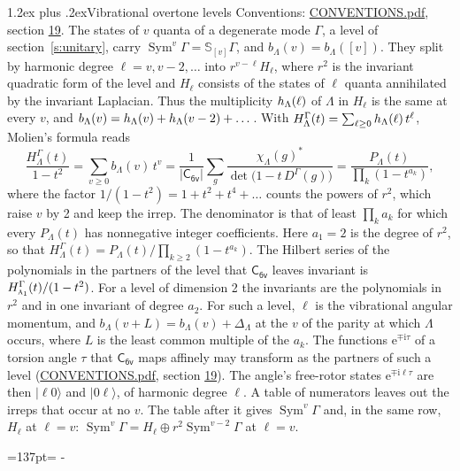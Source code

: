 \documentclass[10pt,a4paper]{article}
\makeatletter
\renewcommand\section{\@startsection{section}{1}{\z@}{-3ex plus -1ex minus -.2ex}%
  {1.2ex plus .2ex}{\normalfont\large\sffamily\bfseries\color{parttitle}}}
\newcommand{\needspace}[1]{\par\penalty-100\begingroup\dimen0=#1\relax\dimen2=\pagegoal
  \advance\dimen2-\pagetotal\ifdim\dimen0>\dimen2\relax\ifdim\dimen2>0pt\vfil\break\fi\fi
  \endgroup}
\numberwithin{equation}{section}
\newcommand{\grp}[1]{\mathsf{#1}}
\newcommand{\irr}[1]{\text{\normalfont\scshape #1}}
\newcommand{\iunit}{\mathrm{i}}
\newcommand{\expe}{\mathrm{e}}
\newcommand{\repD}[1]{D^{#1}}
\newcommand{\irchar}[1]{\chi_{#1}}
\newcommand{\conj}[1]{{#1}^{*}}
\newcommand{\schur}[1]{\mathbb{S}_{#1}}
\newcommand{\shape}[1]{[#1]}
\newcommand{\occ}[1]{\lvert #1\rangle}
\makeatother
\begin{document}
\section{Vibrational overtone levels}\label{s:overtones}
Conventions: \href{../../CONVENTIONS.pdf}{CONVENTIONS.pdf}, section \href{../../CONVENTIONS.pdf\#conv.19}{19}.
\leavevmode\label{n:index.quanta}\label{n:operator.symmetric.power}The states of $v$ quanta of a degenerate mode $\Gamma$, a level of section~\ref{s:unitary}, carry $\operatorname{Sym}^{v}\Gamma = \schur{\shape{v}}\Gamma$, and $b_\Lambda(v) = b_\Lambda(\shape{v})$. \label{n:local.quadratic.form}\label{n:set.harmonic}They split by harmonic degree $\ell = v, v - 2, \dots$ into $r^{v-\ell}H_\ell$, where $r^2$ is the invariant quadratic form of the level and $H_\ell$ consists of the states of $\ell$ quanta annihilated by the invariant Laplacian. \label{n:function.multiplicity.harmonic}Thus the multiplicity $\mathnormal{h}_\Lambda(\ell)$ of $\Lambda$ in $H_\ell$ is the same at every $v$, and $b_\Lambda(v) = \mathnormal{h}_\Lambda(v) + \mathnormal{h}_\Lambda(v - 2) + \dots$. \label{n:function.generating.level}With $H^{\Gamma}_\Lambda(t) = \sum_{\ell\ge0} \mathnormal{h}_\Lambda(\ell)\,t^{\ell}$, Molien's formula reads
\begin{equation}\label{e:molien}\frac{H^{\Gamma}_\Lambda(t)}{1 - t^2} = \sum_{v\ge0} b_\Lambda(v)\,t^v = \frac{1}{|\grp{C_{6v}}|}\sum_{g}\frac{\conj{\irchar{\Lambda}(g)}}{\det\bigl(1 - t\,\repD{\Gamma}(g)\bigr)} = \frac{P_\Lambda(t)}{\prod_k (1-t^{a_k})},\end{equation}
where the factor $1/(1 - t^2) = 1 + t^2 + t^4 + \dots$ counts the powers of $r^2$, which raise $v$ by 2 and keep the irrep. The denominator is that of least $\prod_k a_k$ for which every $P_\Lambda(t)$ has nonnegative integer coefficients. Here $a_1 = 2$ is the degree of $r^2$, so that $H^{\Gamma}_\Lambda(t) = P_\Lambda(t)/\prod_{k\ge2}(1 - t^{a_k})$. The Hilbert series of the polynomials in the partners of the level that $\grp{C_{6v}}$ leaves invariant is $H^{\Gamma}_{\irr{a}_{1}}(t)/(1 - t^2)$. For a level of dimension 2 the invariants are the polynomials in $r^2$ and in one invariant of degree $a_2$. \label{n:index.overtone.period}\label{n:index.increment.unitary}For such a level, $\ell$ is the vibrational angular momentum, and $b_\Lambda(v + L) = b_\Lambda(v) + \Delta_\Lambda$ at the $v$ of the parity at which $\Lambda$ occurs, where $L$ is the least common multiple of the $a_k$. \label{n:local.torsion.angle}The functions $\expe^{\mp\iunit\tau}$ of a torsion angle $\tau$ that $\grp{C_{6v}}$ maps affinely may transform as the partners of such a level (\href{../../CONVENTIONS.pdf}{CONVENTIONS.pdf}, section \href{../../CONVENTIONS.pdf\#conv.19}{19}). The angle's free-rotor states $\expe^{\mp\iunit\ell\tau}$ are then $\occ{\ell 0}$ and $\occ{0 \ell}$, of harmonic degree $\ell$. A table of numerators leaves out the irreps that occur at no $v$. The table after it gives $\operatorname{Sym}^{v}\Gamma$ and, in the same row, $H_\ell$ at $\ell = v$: $\operatorname{Sym}^{v}\Gamma = H_\ell \oplus r^2\operatorname{Sym}^{v-2}\Gamma$ at $\ell = v$.
\needspace{137pt}
\end{document}
